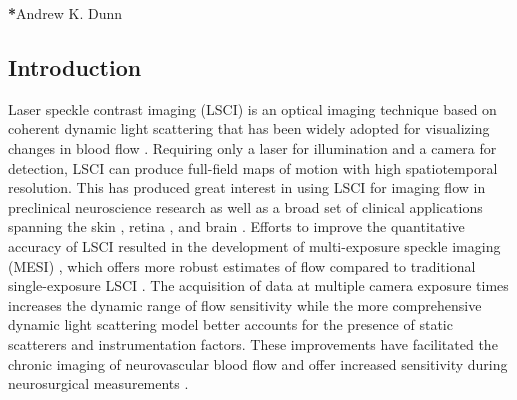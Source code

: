 \documentclass[12pt]{spieman}
\begin{document}

{\noindent \footnotesize\textbf{*}Andrew K. Dunn }

\begin{spacing}{2}


\section{Introduction}
\label{sect:introduction}

Laser speckle contrast imaging (LSCI) is an optical imaging technique based on coherent dynamic light scattering that has been widely adopted for visualizing changes in blood flow \cite{Briers:2001hy,Boas:2010vr}. Requiring only a laser for illumination and a camera for detection, LSCI can produce full-field maps of motion with high spatiotemporal resolution. This has produced great interest in using LSCI for imaging flow in preclinical neuroscience research \cite{Ayata:2004ba,Durduran.2004,Nakamura:2010wp,He:2020} as well as a broad set of clinical applications spanning the skin \cite{Roustit.2010,Mahe.2012}, retina \cite{Briers.1982,Feng.2022}, and brain \cite{Parthasarathy:2010gh,Klijn:2012ls,Miller.2022}. Efforts to improve the quantitative accuracy of LSCI resulted in the development of multi-exposure speckle imaging (MESI) \cite{Parthasarathy:2008el}, which offers more robust estimates of flow compared to traditional single-exposure LSCI \cite{Parthasarathy:2010vo,Kazmi:2013hp}. The acquisition of data at multiple camera exposure times increases the dynamic range of flow sensitivity while the more comprehensive dynamic light scattering model better accounts for the presence of static scatterers and instrumentation factors. These improvements have facilitated the chronic imaging of neurovascular blood flow \cite{Schrandt:2015gu,Clark:20194vi,Williamson.2020,Sullender.2022} and offer increased sensitivity during neurosurgical measurements \cite{Richards:2017df}.


\end{spacing}
\end{document}
